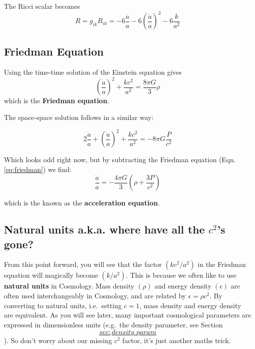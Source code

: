 \documentclass[11pt,a4paper,notoc]{tufte-handout}
\begin{document}
The Ricci scalar becomes
\begin{equation}
R = g_{ik}R_{ik} = - 6\dfrac{\ddot{a}}{a} - 6\left(\dfrac{\dot{a}}{a}\right)^2 - 6\dfrac{k}{a^2}
\label{eq:ric-scal}
\end{equation}

\hypertarget{sec:friedman}{%
\subsection{Friedman Equation}\label{sec:friedman}}

Using the time-time solution of the Einstein equation gives
\begin{equation}
    \left(\dfrac{\dot{a}}{a}\right)^2 + \dfrac{kc^2}{a^2} = \dfrac{8\pi G}{3}\rho
\label{eq:friedman}
\end{equation}
which is the \textbf{Friedman equation}.

The space-space solution follows in a similar way:

\begin{equation}
2\dfrac{\ddot{a}}{a} + \left(\dfrac{\dot{a}}{a}\right)^2 + \dfrac{kc^2}{a^2} = -8\pi G \dfrac{P}{c^2}
\label{eq:acc-part}
\end{equation}

Which looks odd right now, but by subtracting the Friedman equation (Eqn. \eqref{eq:friedman}) we find:
\begin{equation}
    \dfrac{\ddot{a}}{a} = -\dfrac{4\pi G}{3}\left(\rho + \dfrac{3P}{c^2}\right)
\label{eq:acceleration}
\end{equation}

which is the known as the \textbf{acceleration equation}.

\hypertarget{sec:natural_units}{%
\subsection{\texorpdfstring{Natural units a.k.a. where have all the \(c^2\)'s gone?}{Natural units a.k.a. where have all the c\^{}2's gone?}}\label{sec:natural_units}}

From this point forward, you will see that the factor
\(\left(k c^2/a^2\right)\) in the Friedman equation will magically become
\(\left(k/a^2\right)\). This is because we often like to use \textbf{natural
units} in Cosmology. Mass density \(\left(\rho\right)\) and energy
density \(\left(\epsilon\right)\) are often used interchangeably in
Cosmology, and are related by \(\epsilon = \rho c^2\). By converting to
natural units, i.e.~setting \(c=1\), mass density and energy density are
equivalent. As you will see later, many important cosmological
parameters are expressed in dimensionless units (e.g.~the density
parameter, see
Section~\protect\hyperlink{sec:density_param}{\[sec:density\_param\]}). So don't worry about our missing \(c^2\)
factor, it's just another maths trick.
\end{document}
